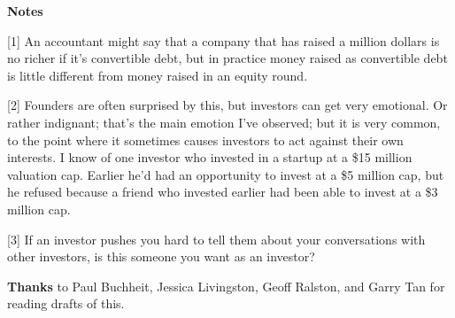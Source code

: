 \textbf{Notes}

{[}1{]} An accountant might say that a company that has raised a million
dollars is no richer if it's convertible debt, but in practice money
raised as convertible debt is little different from money raised in an
equity round.

{[}2{]} Founders are often surprised by this, but investors can get very
emotional. Or rather indignant; that's the main emotion I've observed;
but it is very common, to the point where it sometimes causes investors
to act against their own interests. I know of one investor who invested
in a startup at a \$15 million valuation cap. Earlier he'd had an
opportunity to invest at a \$5 million cap, but he refused because a
friend who invested earlier had been able to invest at a \$3 million
cap.

{[}3{]} If an investor pushes you hard to tell them about your
conversations with other investors, is this someone you want as an
investor?

\textbf{Thanks} to Paul Buchheit, Jessica Livingston, Geoff Ralston, and
Garry Tan for reading drafts of this.
